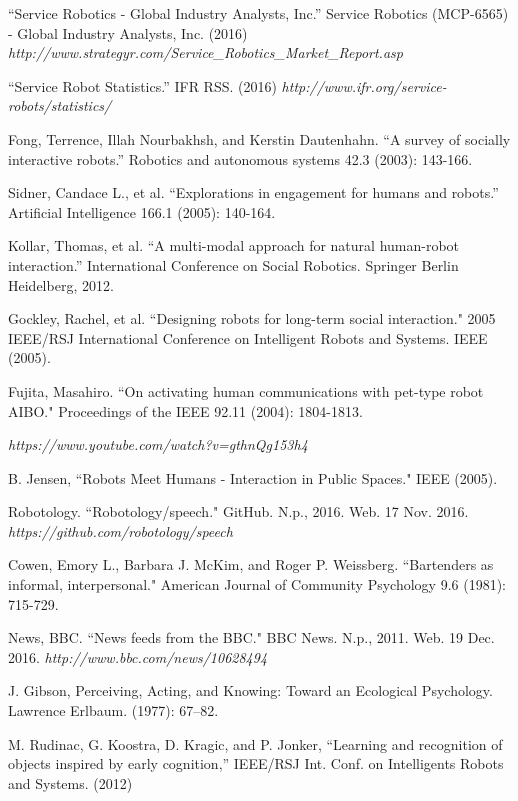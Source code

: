 \documentclass[conference]{IEEEtran}
\begin{document}
\begin{thebibliography}{1}
	
	
``Service Robotics - Global Industry Analysts, Inc.'' Service Robotics (MCP-6565) - Global Industry Analysts, Inc. (2016)
\emph{http://www.strategyr.com/Service\_Robotics\_Market\_Report.asp}

``Service Robot Statistics.'' IFR RSS. (2016)
\emph{http://www.ifr.org/service-robots/statistics/}


Fong, Terrence, Illah Nourbakhsh, and Kerstin Dautenhahn. ``A survey of socially interactive robots.'' Robotics and autonomous systems 42.3 (2003): 143-166.

Sidner, Candace L., et al. ``Explorations in engagement for humans and robots.'' Artificial Intelligence 166.1 (2005): 140-164.


Kollar, Thomas, et al. ``A multi-modal approach for natural human-robot interaction.'' International Conference on Social Robotics. Springer Berlin Heidelberg, 2012.

Gockley, Rachel, et al. ``Designing robots for long-term social interaction." 2005 IEEE/RSJ International Conference on Intelligent Robots and Systems. IEEE (2005).


Fujita, Masahiro. ``On activating human communications with pet-type robot AIBO." Proceedings of the IEEE 92.11 (2004): 1804-1813.

\emph{https://www.youtube.com/watch?v=gthnQg153h4}

B. Jensen, ``Robots Meet Humans - Interaction in Public Spaces."
IEEE (2005).

Robotology. ``Robotology/speech." GitHub. N.p., 2016. Web. 17 Nov. 2016. \emph{https://github.com/robotology/speech}

Cowen, Emory L., Barbara J. McKim, and Roger P. Weissberg. ``Bartenders as informal, interpersonal." American Journal of Community Psychology 9.6 (1981): 715-729.

News, BBC. ``News feeds from the BBC." BBC News. N.p., 2011. Web. 19 Dec. 2016. \emph{http://www.bbc.com/news/10628494}

 J. Gibson, Perceiving, Acting, and Knowing: Toward an Ecological
Psychology. Lawrence Erlbaum. (1977): 67–82.

  M. Rudinac, G. Koostra, D. Kragic, and P. Jonker, ``Learning and
recognition of objects inspired by early cognition,” IEEE/RSJ Int. Conf. on Intelligents Robots and Systems. (2012)



\end{thebibliography}
\end{document}
